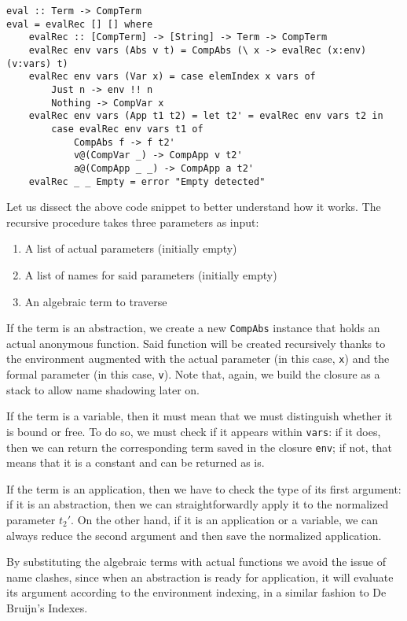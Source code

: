 \documentclass{article}
\begin{document}
\begin{lstlisting}
eval :: Term -> CompTerm
eval = evalRec [] [] where
    evalRec :: [CompTerm] -> [String] -> Term -> CompTerm
    evalRec env vars (Abs v t) = CompAbs (\ x -> evalRec (x:env) (v:vars) t)
    evalRec env vars (Var x) = case elemIndex x vars of
        Just n -> env !! n
        Nothing -> CompVar x
    evalRec env vars (App t1 t2) = let t2' = evalRec env vars t2 in
        case evalRec env vars t1 of
            CompAbs f -> f t2'
            v@(CompVar _) -> CompApp v t2'
            a@(CompApp _ _) -> CompApp a t2'
    evalRec _ _ Empty = error "Empty detected"
\end{lstlisting}

Let us dissect the above code snippet to better understand how it works. The recursive procedure takes three parameters as input:

\begin{enumerate}
    \item A list of actual parameters (initially empty)
    \item A list of names for said parameters (initially empty)
    \item An algebraic term to traverse
\end{enumerate}

If the term is an abstraction, we create a new \lstinline|CompAbs| instance that holds an actual anonymous function. Said function will be created recursively thanks to the environment augmented with the actual parameter (in this case, \lstinline|x|) and the formal parameter (in this case, \lstinline|v|). Note that, again, we build the closure as a stack to allow name shadowing later on.

If the term is a variable, then it must mean that we must distinguish whether it is bound or free. To do so, we must check if it appears within \lstinline|vars|: if it does, then we can return the corresponding term saved in the closure \lstinline|env|; if not, that means that it is a constant and can be returned as is.

If the term is an application, then we have to check the type of its first argument: if it is an abstraction, then we can straightforwardly apply it to the normalized parameter $t_2'$. On the other hand, if it is an application or a variable, we can always reduce the second argument and then save the normalized application.

By substituting the algebraic terms with actual functions we avoid the issue of name clashes, since when an abstraction is ready for application, it will evaluate its argument according to the environment indexing, in a similar fashion to De Bruijn's Indexes.
\end{document}
